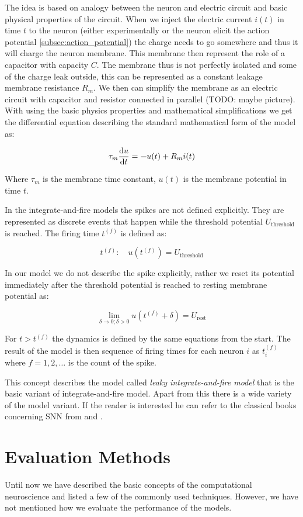 The idea is based on analogy between the neuron and electric circuit and basic physical properties of the circuit. When we inject the electric current $i(t)$ in time $t$ to the neuron (either experimentally or the neuron elicit the action potential \ref{subsec:action_potential}) the charge needs to go somewhere and thus it will charge the neuron membrane. This membrane then represent the role of a capacitor with capacity $C$. The membrane thus is not perfectly isolated and some of the charge leak outside, this can be represented as a constant leakage membrane resistance $R_m$. We then can simplify the membrane as an electric circuit with capacitor and resistor connected in parallel (TODO: maybe picture). With using the basic physics properties and mathematical simplifications we get the differential equation describing the standard mathematical form of the model as:

\begin{equation}
    \tau_{m} \odv{u}{t} = -u(t) + R_{m}i(t)
\end{equation}
\label{eq:integrate_and_fire}

Where $\tau_{m}$ is the membrane time constant, $u(t)$ is the membrane potential in time $t$.

In the integrate-and-fire models the spikes are not defined explicitly. They are represented as discrete events that happen while the threshold potential $U_{\text{threshold}}$ is reached. The firing time $t^{(f)}$ is defined as:

\begin{equation}
    t^{(f)}: \quad u(t^{(f)}) = U_{\text{threshold}}
\end{equation}
\label{eq:firing_time}

In our model we do not describe the spike explicitly, rather we reset its potential immediately after the threshold potential is reached to resting membrane potential as:

\begin{equation}
    \lim_{\delta \to 0; \delta > 0} u\left( t^{(f)} + \delta \right) = U_{\text{rest}}
\end{equation}
\label{eq:resting_potential}

For $t > t^{(f)}$ the dynamics is defined by the same equations from the start. The result of the model is then sequence of firing times for each neuron $i$ as $t^{(f)}_i$ where $f = 1, 2, \dots$ is the count of the spike.

This concept describes the model called \emph{leaky integrate-and-fire model} that is the basic variant of integrate-and-fire model. Apart from this there is a wide variety of the model variant. If the reader is interested he can refer to the classical books concerning SNN from \citet{dayan2005theoretical} and \citet{gerstner2002spiking}.

\section{Evaluation Methods}
\label{sec:evaluation_methods}
Until now we have described the basic concepts of the computational neuroscience and listed a few of the commonly used techniques. However, we have not mentioned how we evaluate the performance of the models.